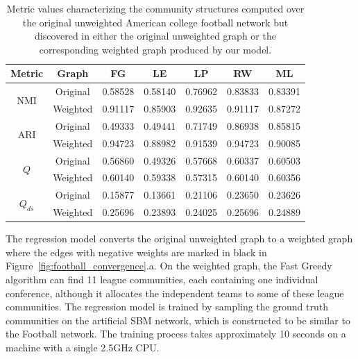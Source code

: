 \begin{table}[!t]
\caption{Metric values characterizing the community structures computed over the original unweighted American college football network but discovered in either the original unweighted graph or the corresponding weighted graph produced by our model.}
\label{table:football}
\centering
\setlength\tabcolsep{2pt}
\begin{tabular}{ |c|c|c|c|c|c|c| }
 \hline
Metric & Graph & FG & LE & LP & RW & ML \\
 \hline
 \multirow{2}{*}{NMI} & Original &0.58528&0.58140&0.76962&0.83833&0.83391\\
 & Weighted & 0.91117&0.85903&0.92635&0.91117&0.87272\\
\hline
 \multirow{2}{*}{ARI} & Original &0.49333&0.49441&0.71749&0.86938&0.85815\\
 & Weighted &0.94723&0.88982&0.91539&0.94723&0.90085\\
 \hline
 \multirow{2}{*}{$Q$} & Original &
 0.56860&0.49326&0.57668&0.60337&0.60503\\
 & Weighted & 0.60140&0.59338&0.57315&0.60140&0.60356\\
 \hline
 \multirow{2}{*}{$Q_{ds}$} & Original &0.15877&0.13661&0.21106&0.23650&0.23626\\
 & Weighted &0.25696&0.23893&0.24025&0.25696&0.24889\\
 \hline
\end{tabular}
\end{table}
The regression model converts the original unweighted graph to a weighted graph where the edges with negative weights are marked in black in Figure~\ref{fig:football_convergence}.a. On the weighted graph, the Fast Greedy algorithm can find 11 league communities, each containing one individual conference, although it allocates the independent teams to some of these league communities. The regression model is trained by sampling the ground truth communities on the artificial SBM network, which is constructed to be similar to the Football network. The training process takes approximately 10 seconds on a machine with a single 2.5GHz CPU.
